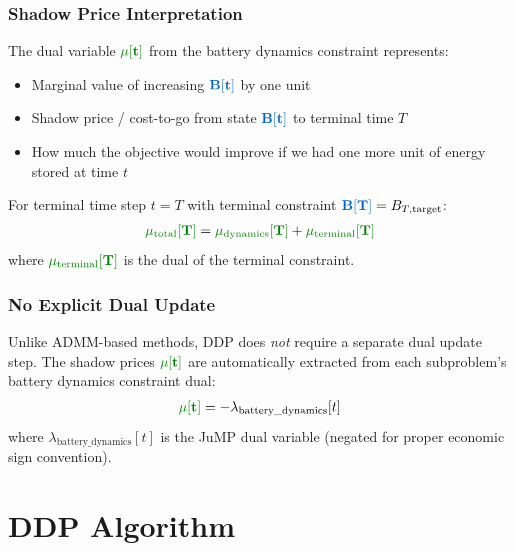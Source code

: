 \documentclass[11pt]{article}
\newcommand{\blueB}[1]{\textcolor{bluevar}{\mathbf{#1}}}      %
\newcommand{\greenmu}[1]{\textcolor{greenvar}{\mathbf{#1}}}   %
\begin{document}
\subsubsection{Shadow Price Interpretation}
The dual variable $\greenmu{\mu[t]}$ from the battery dynamics constraint represents:
\begin{itemize}
    \item Marginal value of increasing $\blueB{B[t]}$ by one unit
    \item Shadow price / cost-to-go from state $\blueB{B[t]}$ to terminal time $T$
    \item How much the objective would improve if we had one more unit of energy stored at time $t$
\end{itemize}

For terminal time step $t = T$ with terminal constraint $\blueB{B[T]} = B_{T,\text{target}}$:
\begin{align}
\greenmu{\mu_{\text{total}}[T]} = \greenmu{\mu_{\text{dynamics}}[T]} + \greenmu{\mu_{\text{terminal}}[T]}
\end{align}
where $\greenmu{\mu_{\text{terminal}}[T]}$ is the dual of the terminal constraint.

\subsubsection{No Explicit Dual Update}
Unlike ADMM-based methods, DDP does \textit{not} require a separate dual update step. The shadow prices $\greenmu{\mu[t]}$ are automatically extracted from each subproblem's battery dynamics constraint dual:
\begin{align}
\greenmu{\mu[t]} = -\lambda_{\text{battery\_dynamics}}[t]
\end{align}
where $\lambda_{\text{battery\_dynamics}}[t]$ is the JuMP dual variable (negated for proper economic sign convention).

\section{DDP Algorithm}
\end{document}

